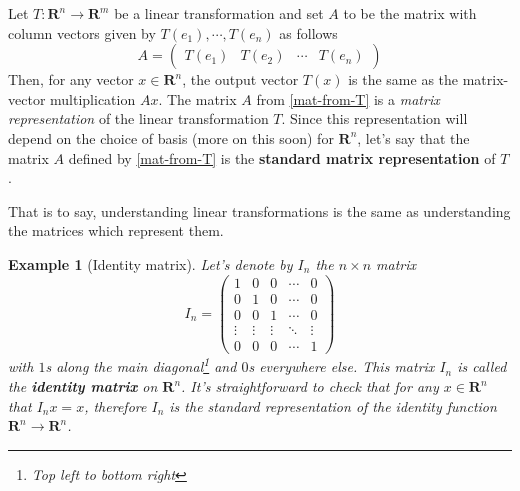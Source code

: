 \documentclass[12pt]{article}
\numberwithin{equation}{subsection}
\numberwithin{figure}{subsection}
\theoremstyle{note}
\newtheorem{example}[subsection]{Example}
\begin{document}
Let $T\colon \mathbf{R}^n\to\mathbf{R}^m$ be a linear transformation and set $A$ to be the matrix with column vectors given by $T(e_1), \cdots, T(e_n)$ as follows \begin{equation} \label{mat-from-T} A= \begin{pmatrix} T(e_1) & T(e_2) & \cdots & T(e_n) \end{pmatrix} \end{equation} Then, for any vector $x\in\mathbf{R}^n$, the output vector $T(x)$ is the same as the matrix-vector multiplication $Ax$. The matrix $A$ from \eqref{mat-from-T} is a \textit{matrix representation} of the linear transformation $T$. Since this representation will depend on the choice of basis (more on this soon) for $\mathbf{R}^n$, let's say that the matrix $A$ defined by \ref{mat-from-T} is the \textbf{standard matrix representation} of $T$.

That is to say, understanding linear transformations is the same as understanding the matrices which represent them. 

\begin{example}[Identity matrix] 
Let's denote by $I_n$ the $n\times n$ matrix \begin{equation} I_n = \begin{pmatrix} 1 & 0 & 0  & \cdots & 0 \\ 0 & 1 & 0  &\cdots & 0 \\
0 & 0 & 1 & \cdots & 0 \\ 
\vdots & \vdots &\vdots  &  \ddots & \vdots \\
0 &0  &0  & \cdots& 1 \end{pmatrix}\end{equation}with $1$s along the main diagonal\footnote{Top left to bottom right} and $0$s everywhere else. This matrix $I_n$ is called the \textbf{identity matrix} on $\mathbf{R}^n$. It's straightforward to check that for any $x\in\mathbf{R}^n$ that $I_nx=x$, therefore $I_n$ is the standard representation of the identity function $\mathbf{R}^n\to\mathbf{R}^n$. 
\end{example}	
\end{document}
